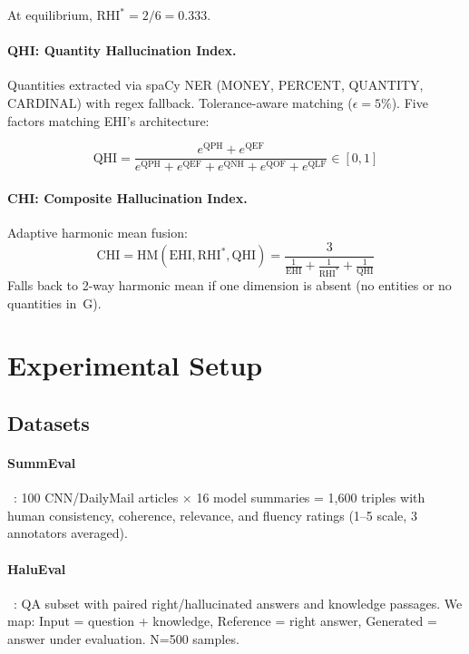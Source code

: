 \documentclass[11pt]{article}
\newcommand{\EHI}{\text{EHI}}
\newcommand{\RHI}{\text{RHI}^*}
\newcommand{\QHI}{\text{QHI}}
\newcommand{\CHI}{\text{CHI}}
\begin{document}
At equilibrium, $\RHI = 2/6 = 0.333$.

\paragraph{QHI: Quantity Hallucination Index.} Quantities extracted via spaCy NER (MONEY, PERCENT, QUANTITY, CARDINAL) with regex fallback. Tolerance-aware matching ($\epsilon = 5\%$). Five factors matching EHI's architecture:

\begin{equation}
\QHI = \frac{e^{\text{QPH}} + e^{\text{QEF}}}{e^{\text{QPH}} + e^{\text{QEF}} + e^{\text{QNH}} + e^{\text{QOF}} + e^{\text{QLF}}} \in [0, 1]
\label{eq:qhi}
\end{equation}

\paragraph{CHI: Composite Hallucination Index.} Adaptive harmonic mean fusion:
\begin{equation}
\CHI = \text{HM}(\EHI, \RHI, \QHI) = \frac{3}{\frac{1}{\EHI} + \frac{1}{\RHI} + \frac{1}{\QHI}}
\label{eq:chi}
\end{equation}
Falls back to 2-way harmonic mean if one dimension is absent (no entities or no quantities in~G).


\section{Experimental Setup}

\subsection{Datasets}

\paragraph{SummEval}~\cite{fabbri2021summeval}: 100 CNN/DailyMail articles $\times$ 16 model summaries = 1,600 triples with human consistency, coherence, relevance, and fluency ratings (1--5 scale, 3 annotators averaged).

\paragraph{HaluEval}~\cite{li2023halueval}: QA subset with paired right/hallucinated answers and knowledge passages. We map: Input = question + knowledge, Reference = right answer, Generated = answer under evaluation. N=500 samples.
\end{document}
